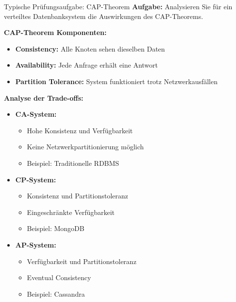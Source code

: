 \begin{example2}{Typische Prüfungsaufgabe: CAP-Theorem}
\textbf{Aufgabe:}
Analysieren Sie für ein verteiltes Datenbanksystem die Auswirkungen des CAP-Theorems.

\textbf{CAP-Theorem Komponenten:}
\begin{itemize}
    \item \textbf{Consistency:} Alle Knoten sehen dieselben Daten
    \item \textbf{Availability:} Jede Anfrage erhält eine Antwort
    \item \textbf{Partition Tolerance:} System funktioniert trotz Netzwerkausfällen
\end{itemize}

\textbf{Analyse der Trade-offs:}
\begin{itemize}
    \item \textbf{CA-System:}
    \begin{itemize}
        \item Hohe Konsistenz und Verfügbarkeit
        \item Keine Netzwerkpartitionierung möglich
        \item Beispiel: Traditionelle RDBMS
    \end{itemize}
    \item \textbf{CP-System:}
    \begin{itemize}
        \item Konsistenz und Partitionstoleranz
        \item Eingeschränkte Verfügbarkeit
        \item Beispiel: MongoDB
    \end{itemize}
    \item \textbf{AP-System:}
    \begin{itemize}
        \item Verfügbarkeit und Partitionstoleranz
        \item Eventual Consistency
        \item Beispiel: Cassandra
    \end{itemize}
\end{itemize}
\end{example2}

